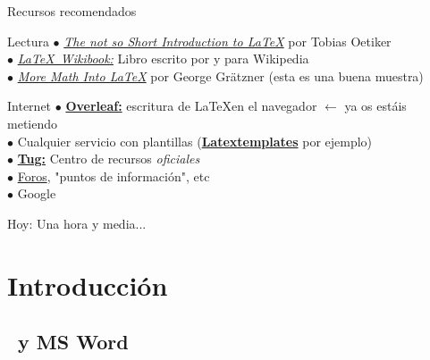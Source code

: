 \documentclass{beamer}
\begin{document}
\begin{frame}{Recursos recomendados}
\begin{block}{Lectura}
	$\bullet$ \href{https://tobi.oetiker.ch/lshort/lshort.pdf}{\textit{The not so Short Introduction to \LaTeX}} por Tobias Oetiker \\
	$\bullet$ \href{https://en.wikibooks.org/wiki/LaTeX}{\textit{\LaTeX\ Wikibook:}} Libro escrito por y para Wikipedia \\
	$\bullet$ \href{http://osl.ugr.es/CTAN/info/Math_into_LaTeX-4/Short_Course.pdf}{\textit{More Math Into \LaTeX}} por George Grätzner (esta es una buena muestra)
\end{block}
\begin{block}{Internet}
	$\bullet$ \href{https://www.overleaf.com/}{\textbf{Overleaf:}} escritura de \LaTeX en el navegador $\leftarrow$ ya os estáis metiendo \\
	$\bullet$ Cualquier servicio con plantillas (\href{http://www.latextemplates.com/}{\textbf{Latextemplates}} por ejemplo) \\
	$\bullet$ \href{https://www.tug.org/begin.html}{\textbf{Tug:}} Centro de recursos \textit{oficiales} \\
	$\bullet$ \href{https://es.sharelatex.com/learn/}{Foros}, "puntos de información", etc \\
	$\bullet$ Google
\end{block}

\end{frame}

\begin{frame}
	Hoy: Una hora y media...
	\tableofcontents
\end{frame}


\section{Introducción} %

\subsection{\LaTeXe\ y MS Word} %
\end{document}

